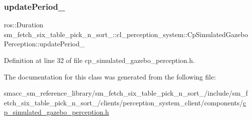 \subsubsection{\texorpdfstring{update\+Period\+\_\+}{updatePeriod\_}}
{\footnotesize\ttfamily ros\+::\+Duration sm\+\_\+fetch\+\_\+six\+\_\+table\+\_\+pick\+\_\+n\+\_\+sort\+\_\+::cl\+\_\+perception\+\_\+system\+::\+Cp\+Simulated\+Gazebo\+Perception\+::update\+Period\+\_\+\hspace{0.3cm}{\ttfamily [private]}}



Definition at line 32 of file cp\+\_\+simulated\+\_\+gazebo\+\_\+perception.\+h.



The documentation for this class was generated from the following file\+:\begin{DoxyCompactItemize}
\item 
smacc\+\_\+sm\+\_\+reference\+\_\+library/sm\+\_\+fetch\+\_\+six\+\_\+table\+\_\+pick\+\_\+n\+\_\+sort\+\_/include/sm\+\_\+fetch\+\_\+six\+\_\+table\+\_\+pick\+\_\+n\+\_\+sort\+\_/clients/perception\+\_\+system\+\_\+client/components/\hyperlink{cp__simulated__gazebo__perception_8h}{cp\+\_\+simulated\+\_\+gazebo\+\_\+perception.\+h}\end{DoxyCompactItemize}
